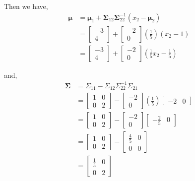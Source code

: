 \documentclass[12pt]{article}\usepackage[]{graphicx}\usepackage[]{color}
\newcommand{\vct}{\mathbf}
\begin{document}
\begin{enumerate}[a)]
Then we have,
\begin{align*}
\vct{\mu} &= \vct{\mu}_1 + \vct{\Sigma}_{12}\vct{\Sigma}_{22}^{-1}(x_2 - \vct{\mu}_2)\\
&= \begin{bmatrix} -3 \\ 4 \end{bmatrix} + \begin{bmatrix} -2 \\ 0 \end{bmatrix} (\frac{1}{5})(x_2 - 1)\\
&= \begin{bmatrix} -3 \\ 4 \end{bmatrix} + \begin{bmatrix} -2 \\ 0 \end{bmatrix} (\frac{1}{5}x_2 - \frac{1}{5})
\end{align*}

and,
\begin{align*}
\vct{\Sigma} &= \Sigma_{11} - \Sigma_{12}\Sigma_{22}^{-1}\Sigma_{21}\\
&= \begin{bmatrix} 1 & 0 \\ 0 & 2 \end{bmatrix} - \begin{bmatrix} -2 \\ 0 \end{bmatrix} \left(\frac{1}{5}\right) \begin{bmatrix} -2 & 0 \end{bmatrix}\\
&= \begin{bmatrix} 1 & 0 \\ 0 & 2 \end{bmatrix} - \begin{bmatrix} -2 \\ 0 \end{bmatrix} \begin{bmatrix} -\frac{2}{5} & 0 \end{bmatrix}\\
&= \begin{bmatrix} 1 & 0 \\ 0 & 2 \end{bmatrix} - \begin{bmatrix} \frac{4}{5} & 0 \\ 0 & 0 \end{bmatrix}\\
&= \begin{bmatrix} \frac{1}{5} & 0 \\ 0 & 2 \end{bmatrix}
\end{align*}



\end{enumerate}
\end{document}
